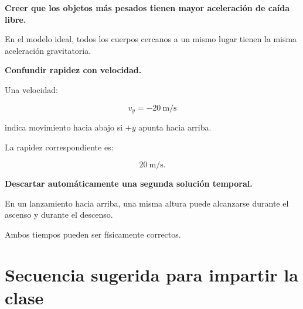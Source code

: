 \begin{errorfrecuente}
\textbf{Creer que los objetos más pesados tienen mayor aceleración de caída libre.}

En el modelo ideal, todos los cuerpos cercanos a un mismo lugar tienen la misma aceleración gravitatoria.
\end{errorfrecuente}


\begin{errorfrecuente}
\textbf{Confundir rapidez con velocidad.}

Una velocidad:

\[ v_y=-\SI{20}{\meter\per\second} \]

indica movimiento hacia abajo si \(+y\) apunta hacia arriba.

La rapidez correspondiente es:

\[ \SI{20}{\meter\per\second}. \]
\end{errorfrecuente}


\begin{errorfrecuente}
\textbf{Descartar automáticamente una segunda solución temporal.}

En un lanzamiento hacia arriba, una misma altura puede alcanzarse durante el ascenso y durante el descenso.

Ambos tiempos pueden ser físicamente correctos.
\end{errorfrecuente}


\section{Secuencia sugerida para impartir la clase}

